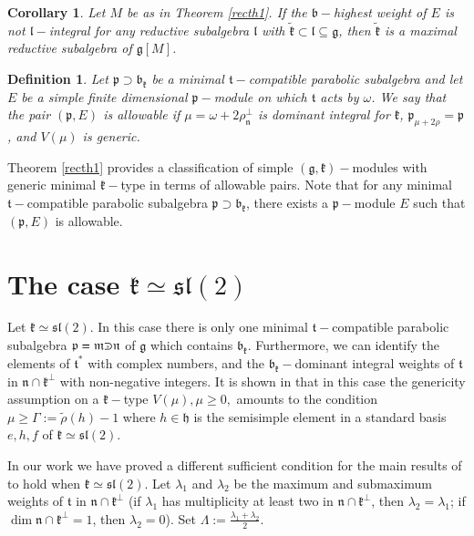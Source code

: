 \documentclass[default]{./styles/svmult}
\newtheorem{cor}[theo]{Corollary}
\newtheorem{defi}[theo]{Definition}
\newcommand{\bb}{\mathfrak{b}}
\renewcommand{\gg}{\mathfrak{g}}
\newcommand{\hh}{\mathfrak{h}}
\newcommand{\kk}{\mathfrak{k}}
\renewcommand{\ll}{\mathfrak{l}}
\newcommand{\mm}{\mathfrak{m}}
\newcommand{\nn}{\mathfrak{n}}
\newcommand{\pp}{\mathfrak{p}}
\renewcommand{\tt}{\mathfrak{t}}
\renewcommand{\sl}{\mathfrak{sl}}
\def\crplus{\hbox{$\supset${\raise1.05pt\hbox{\kern -0.55em ${\scriptscriptstyle +}$}}\ }}
\begin{document}
\begin{cor}\label{corr:6}
 Let $M$ be as in Theorem \ref{recth1}. If the $\bb-$highest weight of $E$ is not $\ll-$integral for any reductive subalgebra $\ll$ with $\tilde{\kk} \subset \ll \subseteq \gg$, then $\tilde{\kk}$ is a maximal reductive subalgebra of $\gg[M]$.
\end{cor}


\begin{defi}\label{def:1}
 Let $\pp \supset \bb_{\kk}$ be a minimal $\tt-$compatible parabolic subalgebra and let $E$ be a simple finite dimensional $\pp-$module on which $\tt$ acts by $\omega$. We say that the pair $(\pp,E)$ is \textit{allowable} if $\mu = \omega + 2\rho^{\perp}_{\nn}$ is dominant integral for $\kk$, $\pp_{\mu+2\rho} = \pp$, and $V(\mu)$ is generic.
\end{defi}

Theorem \ref{recth1} provides a classification of simple $(\gg,\kk)-$modules with generic minimal $\kk-$type in terms of allowable pairs. Note that for any minimal $\tt-$compatible parabolic subalgebra $\pp \supset \bb_{\kk}$, there exists a $\pp-$module $E$ such that $(\pp,E)$ is allowable.

\section{The case $\kk \simeq \sl(2)$}\label{sect:3}

Let $\kk \simeq \sl(2)$. In this case there is only one minimal $\tt-$compatible parabolic subalgebra $\pp = \mm \crplus \nn$ of $\gg$ which contains $\bb_{\kk}$. Furthermore, we can identify the elements of $\tt^*$ with complex numbers, and the $\bb_{\kk}-$dominant integral weights of $\tt$ in $\nn \cap \kk^{\perp}$ with non-negative integers. It is shown in \cite{PZ2} that in this case the genericity assumption on a $\kk-$type $V(\mu), \mu \geq 0,$ amounts to the condition $\mu \geq \Gamma:=\tilde{\rho}(h)-1$ where $h \in \hh$ is the semisimple element in a standard basis $e,h,f$ of $\kk \simeq \sl(2)$.

In our work \cite{PZ5} we have proved a different sufficient condition for the main results of \cite{PZ2} to hold when $\kk \simeq \sl(2)$. Let $\lambda_1$ and $\lambda_2$ be the maximum and submaximum weights of $\tt$ in $\nn \cap \kk^{\perp}$ (if $\lambda_1$ has multiplicity at least two in $\nn \cap \kk^{\perp}$, then $\lambda_2 = \lambda_1$; if $\dim \nn \cap \kk^{\perp} = 1$, then $\lambda_2 = 0$). Set $\Lambda := \frac{\lambda_1 + \lambda_2}{2}$.
\end{document}
